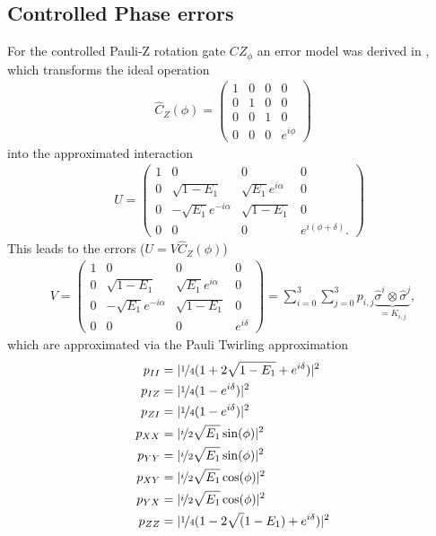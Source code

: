 \subsection{Controlled Phase errors}\label{sec:c_phase_noise} 
For the controlled Pauli-Z rotation gate $CZ_\phi$ an error model was derived in \cite{Ghosh2013}, which  transforms the ideal operation
\begin{align}
\hat{C}_Z(\phi)=\begin{pmatrix}
1 & 0 & 0 & 0\\
0 & 1 & 0 & 0\\
0 & 0 &  1 & 0\\
0 & 0 & 0 & e^{i\phi}\nonumber
\end{pmatrix}
\end{align}
into the approximated interaction
\begin{align}
\quad U=\begin{pmatrix}
1 & 0 & 0 & 0\\
0 & \sqrt{1-E_1} & \sqrt{E_1}e^{i\alpha} & 0\\
0 & -\sqrt{E_1}e^{-i\alpha} &  \sqrt{1-E_1} & 0\\
0 & 0 & 0 & e^{i(\phi+\delta)}.\nonumber
\end{pmatrix}
\end{align}
This leads to the errors ($U=V\hat{C}_Z(\phi)$)
\begin{align}
 V=\begin{pmatrix}
1 & 0 & 0 & 0\\
0 & \sqrt{1-E_1} & \sqrt{E_1}e^{i\alpha} & 0\\
0 & -\sqrt{E_1}e^{-i\alpha} &  \sqrt{1-E_1} & 0\\
0 & 0 & 0 & e^{i\delta}
\end{pmatrix}=\sum_{i=0}^3\sum_{j=0}^3 p_{i,j} \underbrace{\hat{\sigma}^{i}\otimes \hat{\sigma}^{j}}_{=K_{i,j}},\nonumber
\end{align}
which are approximated via the Pauli Twirling approximation
\begin{align}
p_{II}&=|\nicefrac{1}{4}(1+2\sqrt{1-E_1}+e^{i\delta})|^2\nonumber\\
p_{IZ}&=|\nicefrac{1}{4}(1-e^{i\delta})|^2\nonumber\\
p_{ZI}&=|\nicefrac{1}{4}(1-e^{i\delta})|^2\nonumber\\
p_{XX}&=|\nicefrac{i}{2}\sqrt{E_1}\sin(\phi)|^2\nonumber\\
p_{YY}&=|\nicefrac{i}{2}\sqrt{E_1}\sin(\phi)|^2\nonumber\\
p_{XY}&=|\nicefrac{i}{2}\sqrt{E_1}\cos(\phi)|^2\nonumber\\
p_{YX}&=|\nicefrac{i}{2}\sqrt{E_1}\cos(\phi)|^2\nonumber\\
p_{ZZ}&=|\nicefrac{1}{4}(1-2\sqrt(1-E_1)+e^{i\delta})|^2\nonumber
\end{align}